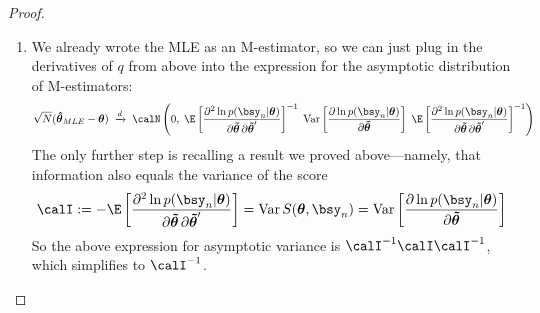 \documentclass[12pt]{article}
\theoremstyle{plain}
\theoremstyle{definition}
\theoremstyle{remark}
\newcommand{\bstheta}{\boldsymbol{\theta}}
\newcommand{\bshattheta}{\boldsymbol{\hat{\theta}}}
\newcommand{\bstildetheta}{\boldsymbol{\tilde{\theta}}}
\newcommand{\Var}{\operatorname{Var}}
\newcommand{\dto}{\xrightarrow{d}}
\begin{document}
\begin{proof}
\begin{enumerate}[label=(\roman*)]
  \item
    We already wrote the MLE as an M-estimator, so we can just plug in
    the derivatives of $q$ from above into the expression for the
    asymptotic distribution of M-estimators:
    \begin{align*}
      \sqrt{N}(\bshattheta_{MLE}-\bstheta)
      \;\dto\;
      \calN\left(0,\;
      \E\left[
      \frac{\partial^2 \ln p(\bsy_n|\bstheta)}{%
        \partial\bstildetheta\,\partial\bstildetheta'}
      \right]^{-1}
      \;
      \Var\left[
        \frac{\partial \ln p(\bsy_n|\bstheta)}{\partial \bstildetheta}
      \right]
      \;
      \E\left[
      \frac{\partial^2 \ln p(\bsy_n|\bstheta)}{%
        \partial\bstildetheta\,\partial\bstildetheta'}
      \right]^{-1}
      \right)
    \end{align*}
    The only further step is recalling a result we proved
    above---namely, that information also equals the variance of the
    score
    \begin{align*}
      \calI
      := -\E\left[
        \frac{\partial^2 \ln p(\bsy_n|\bstheta)}{%
          \partial \bstildetheta \,\partial \bstildetheta'}
        \right]
      =
      \Var S(\bstheta,\bsy_n)
      = \Var\left[
        \frac{\partial \ln p(\bsy_n|\bstheta)}{%
          \partial \bstildetheta}
        \right]
    \end{align*}
    So the above expression for asymptotic variance is
    $\calI^{-1}\calI\calI^{-1}$, which simplifies to $\calI^{-1}$.
\end{enumerate}
\end{proof}

\end{document}
